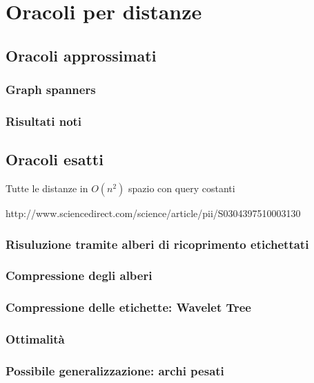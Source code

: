 \documentclass[a4paper,10pt]{amsbook}
\theoremstyle{plain}
\theoremstyle{definition}
\theoremstyle{remark}
\begin{document}
\chapter{Oracoli per distanze}

\section{Oracoli approssimati}

\subsection{Graph spanners}

\subsection{Risultati noti}

\section{Oracoli esatti}

Tutte le distanze in $O(n^2)$ spazio con query costanti

http://www.sciencedirect.com/science/article/pii/S0304397510003130

\subsection{Risuluzione tramite alberi di ricoprimento etichettati}

\subsection{Compressione degli alberi}

\subsection{Compressione delle etichette: Wavelet Tree}

\subsection{Ottimalità}

\subsection{Possibile generalizzazione: archi pesati}
\end{document}
